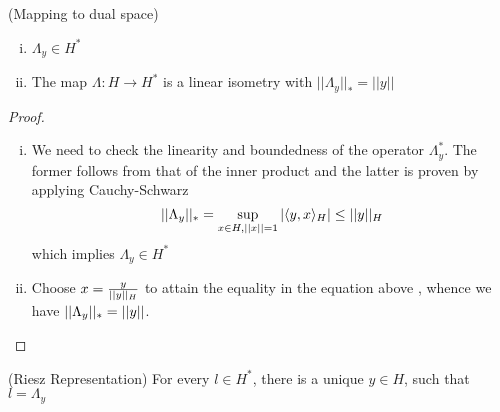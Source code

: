 \documentclass{article}
\begin{document}
\begin{lemma}
    (Mapping to dual space)
    \begin{enumerate}[i)]
        \item $\Lambda_y \in H^*$
        \item The map $\Lambda: H \to H^*$ is a linear isometry with $||\Lambda_y||_{*}=||y||$
    \end{enumerate}
\end{lemma}  

\begin{proof}
    \begin{enumerate}[i)]
        \item We need to check the linearity and boundedness of the operator $\Lambda_y^*$. The former follows from that of the inner product and the latter is proven by applying Cauchy-Schwarz  
        \begin{equation*}
            ||\Lambda_y||_* = \sup_{x\in H, ||x||=1} |\langle y, x \rangle_H| \leq ||y||_H
        \end{equation*}  
        which implies $\Lambda_y \in H^*$
        
        \item Choose $x = \frac{y}{||y||_H}$ to attain the equality in the equation above , whence we have $||\Lambda_y||_*=||y||$.
    \end{enumerate}
\end{proof}

\begin{thm}
    (Riesz Representation)  
    For every $l \in H^*$, there is a unique $y \in H$, such that $l=\Lambda_y$
\end{thm}  
\end{document}

